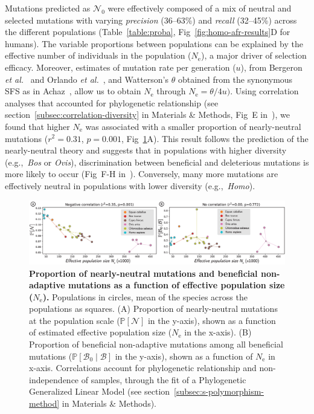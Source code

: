 \documentclass[10pt,letterpaper]{article}
\newcommand{\Ne}{N_{\text{e}}}
\newcommand{\proba}{\mathbb{P}}
\newcommand{\SphyNeu}{\mathcal{N}_0}
\newcommand{\SphyBen}{\mathcal{B}_0}
\newcommand{\given}{\mid}
\newcommand{\SpopNeu}{\mathcal{N}}
\newcommand{\SpopBen}{\mathcal{B}}
\begin{document}
Mutations predicted as $\SphyNeu$ were effectively composed of a mix of neutral and selected mutations with varying \textit{precision} (36--63\%) and \textit{recall} (32--45\%) across the different populations (Table~\ref{table:proba}, Fig~\ref{fig:homo-afr-results}D for humans).
The variable proportions between populations can be explained by the effective number of individuals in the population ($\Ne$), a major driver of selection efficacy.
Moreover, estimates of mutation rate per generation ($u$), from Bergeron \textit{et al.}~\cite{bergeron_evolution_2023} and Orlando \textit{et al.}~\cite{orlando_recalibrating_2013}, and Watterson’s $\theta$ obtained from the synonymous SFS as in Achaz~\cite{achaz_frequency_2009}, allow us to obtain $\Ne$ through $\Ne=\theta/4 u)$.
Using correlation analyses that accounted for phylogenetic relationship (see section~\ref{subsec:correlation-diversity} in Materials \& Methods, Fig~E in~), we found that higher $\Ne$ was associated with a smaller proportion of nearly-neutral mutations ($r^2=0.31$, $p=0.001$, Fig~\ref{fig:diversity}A).
This result follows the prediction of the nearly-neutral theory and suggests that in populations with higher diversity (e.g.,~\textit{Bos} or \textit{Ovis}), discrimination between beneficial and deleterious mutations is more likely to occur (Fig~F-H in~).
Conversely, many more mutations are effectively neutral in populations with lower diversity (e.g.,~\textit{Homo}).

\begin{figure}[!ht]
\begin{adjustwidth}{-2.25in}{0in} %
\centering
\includegraphics[width=1.4\textwidth, page=1] {figure4.eps}
\caption{
{\bf Proportion of nearly-neutral mutations and beneficial non-adaptive mutations as a function of effective population size ($\Ne$).}
Populations in circles, mean of the species across the populations as squares.
(A) Proportion of nearly-neutral mutations at the population scale ($\proba [ \SpopNeu]$ in the y-axis), shown as a function of estimated effective population size ($\Ne$ in the x-axis).
(B) Proportion of beneficial non-adaptive mutations among all beneficial mutations ($\proba [ \SphyBen \given \SpopBen]$ in the y-axis), shown as a function of $\Ne$ in x-axis.
Correlations account for phylogenetic relationship and non-independence of samples, through the fit of a Phylogenetic Generalized Linear Model (see section~\ref{subsec:s-polymorphism-method} in Materials \& Methods).
}
\label{fig:diversity}
\end{adjustwidth}
\end{figure}
\end{document}
